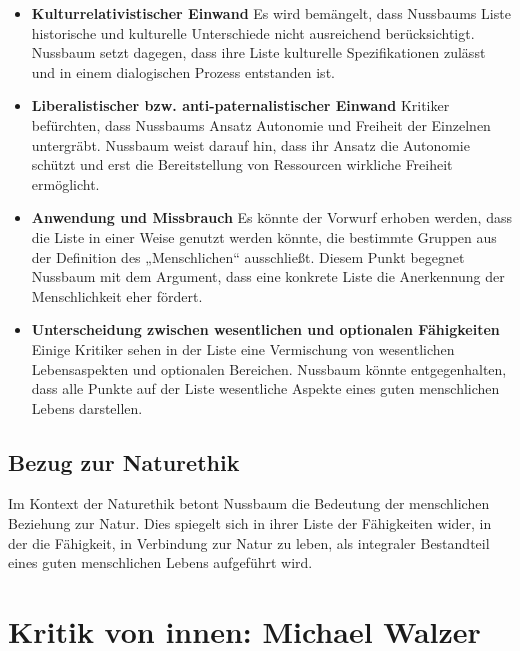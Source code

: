 \documentclass{article}
\begin{document}
\begin{itemize}
	\item \textbf{Kulturrelativistischer Einwand}
	      Es wird bemängelt, dass Nussbaums Liste historische und kulturelle Unterschiede nicht ausreichend berücksichtigt. Nussbaum setzt dagegen, dass ihre Liste kulturelle Spezifikationen zulässt und in einem dialogischen Prozess entstanden ist.

	\item \textbf{Liberalistischer bzw. anti-paternalistischer Einwand}
	      Kritiker befürchten, dass Nussbaums Ansatz Autonomie und Freiheit der Einzelnen untergräbt. Nussbaum weist darauf hin, dass ihr Ansatz die Autonomie schützt und erst die Bereitstellung von Ressourcen wirkliche Freiheit ermöglicht.

	\item \textbf{Anwendung und Missbrauch}
	      Es könnte der Vorwurf erhoben werden, dass die Liste in einer Weise genutzt werden könnte, die bestimmte Gruppen aus der Definition des „Menschlichen“ ausschließt. Diesem Punkt begegnet Nussbaum mit dem Argument, dass eine konkrete Liste die Anerkennung der Menschlichkeit eher fördert.

	\item \textbf{Unterscheidung zwischen wesentlichen und optionalen Fähigkeiten}
	      Einige Kritiker sehen in der Liste eine Vermischung von wesentlichen Lebensaspekten und optionalen Bereichen. Nussbaum könnte entgegenhalten, dass alle Punkte auf der Liste wesentliche Aspekte eines guten menschlichen Lebens darstellen.
\end{itemize}

\subsection*{Bezug zur Naturethik}

Im Kontext der Naturethik betont Nussbaum die Bedeutung der menschlichen Beziehung zur Natur. Dies spiegelt sich in ihrer Liste der Fähigkeiten wider, in der die Fähigkeit, in Verbindung zur Natur zu leben, als integraler Bestandteil eines guten menschlichen Lebens aufgeführt wird.



\newpage
\section{Kritik von innen: Michael Walzer}
\end{document}
